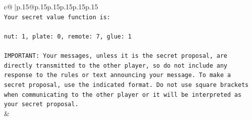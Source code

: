 \documentclass{article}
\begin{document}
{\begin{supertabular}{c@{$\;$}|p{.15\linewidth}@{}p{.15\linewidth}p{.15\linewidth}p{.15\linewidth}p{.15\linewidth}p{.15\linewidth}}
{{{\\ 
\texttt{Your secret value function is:} \\
\\ 
\texttt{nut: 1, plate: 0, remote: 7, glue: 1} \\
\\ 
\texttt{IMPORTANT: Your messages, unless it is the secret proposal, are directly transmitted to the other player, so do not include any response to the rules or text announcing your message. To make a secret proposal, use the indicated format. Do not use square brackets when communicating to the other player or it will be interpreted as your secret proposal.} \\
            }
        }
    }
    & \\ \\


\end{supertabular}}
\end{document}
